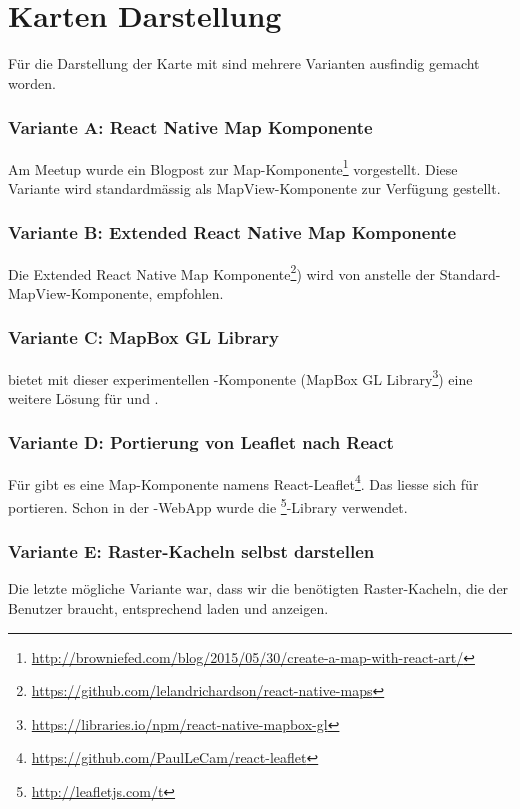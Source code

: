 \section{Karten Darstellung}
\label{tb-evaluation-karte}

Für die Darstellung der Karte mit  sind mehrere Varianten ausfindig gemacht worden.

\subsubsection{Variante A: React Native Map Komponente}
Am  Meetup wurde ein Blogpost zur  Map-Komponente\footnote{\url{http://browniefed.com/blog/2015/05/30/create-a-map-with-react-art/}} vorgestellt. Diese Variante wird standardmässig als MapView-Komponente zur Verfügung gestellt.

\subsubsection{Variante B: Extended React Native Map Komponente}
Die Extended React Native Map Komponente\footnote{\url{https://github.com/lelandrichardson/react-native-maps}}) wird von  anstelle der Standard-MapView-Komponente, empfohlen.


\subsubsection{Variante C: MapBox GL Library}
 bietet mit dieser experimentellen -Komponente (MapBox GL Library\footnote{\url{https://libraries.io/npm/react-native-mapbox-gl}}) eine weitere Lösung für  und .


\subsubsection{Variante D: Portierung von Leaflet nach React}
Für  gibt es eine Map-Komponente namens React-Leaflet\footnote{\url{https://github.com/PaulLeCam/react-leaflet}}. 
Das liesse sich für  portieren.
Schon in der \kort{}-\gls{WebApp} wurde die \footnote{\url{http://leafletjs.com/t}}-Library verwendet.

\subsubsection{Variante E: Raster-Kacheln selbst darstellen}
Die letzte mögliche Variante war, dass wir die benötigten Raster-Kacheln, die der Benutzer braucht, entsprechend laden und anzeigen.

